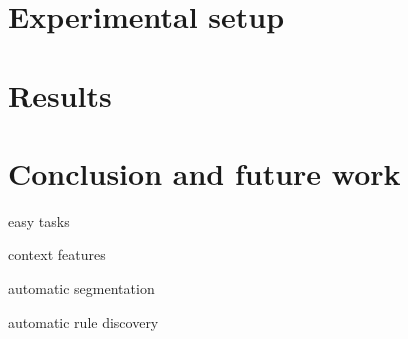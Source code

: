 \documentclass{article}
\begin{document}
\section{Experimental setup}

\section{Results}

\section{Conclusion and future work}

easy tasks

context features

automatic segmentation

automatic rule discovery




\end{document}
